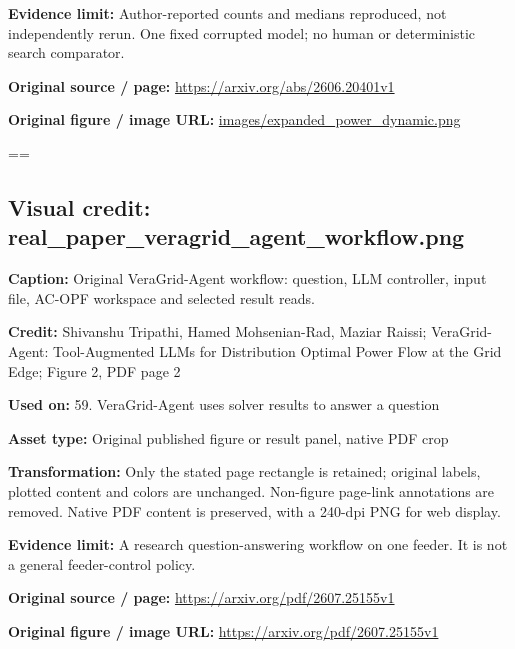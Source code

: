 \documentclass[10pt,letterpaper]{article}
\begin{document}
\textbf{Evidence limit:} Author-reported counts and medians reproduced, not independently rerun. One fixed corrupted model; no human or deterministic search comparator.\par
\textbf{Original source / page:} \href{https://arxiv.org/abs/2606.20401v1}{\small\ttfamily https:/\allowbreak{}/\allowbreak{}arxiv.\allowbreak{}org/\allowbreak{}abs/\allowbreak{}2606.\allowbreak{}20401v1}\par
\textbf{Original figure / image URL:} \href{images/expanded_power_dynamic.png}{\small\ttfamily images/\allowbreak{}expanded\_\allowbreak{}power\_\allowbreak{}dynamic.\allowbreak{}png}\par
\egroup\par\noindent\box\readingEntry\par\medskip
\setbox\readingEntry=\vbox\bgroup\hsize=\linewidth\subsection*{Visual credit: real\_paper\_veragrid\_agent\_workflow.png}
\textbf{Caption:} Original VeraGrid-Agent workflow: question, LLM controller, input file, AC-OPF workspace and selected result reads.\par
\textbf{Credit:} Shivanshu Tripathi, Hamed Mohsenian-Rad, Maziar Raissi; VeraGrid-Agent: Tool-Augmented LLMs for Distribution Optimal Power Flow at the Grid Edge; Figure 2, PDF page 2\par
\textbf{Used on:} 59. VeraGrid-Agent uses solver results to answer a question\par
\textbf{Asset type:} Original published figure or result panel, native PDF crop\par
\textbf{Transformation:} Only the stated page rectangle is retained; original labels, plotted content and colors are unchanged. Non-figure page-link annotations are removed. Native PDF content is preserved, with a 240-dpi PNG for web display.\par
\textbf{Evidence limit:} A research question-answering workflow on one feeder. It is not a general feeder-control policy.\par
\textbf{Original source / page:} \href{https://arxiv.org/pdf/2607.25155v1}{\small\ttfamily https:/\allowbreak{}/\allowbreak{}arxiv.\allowbreak{}org/\allowbreak{}pdf/\allowbreak{}2607.\allowbreak{}25155v1}\par
\textbf{Original figure / image URL:} \href{https://arxiv.org/pdf/2607.25155v1}{\small\ttfamily https:/\allowbreak{}/\allowbreak{}arxiv.\allowbreak{}org/\allowbreak{}pdf/\allowbreak{}2607.\allowbreak{}25155v1}\par
\end{document}
